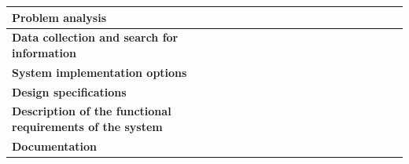 \documentclass[12pt]{article}
\begin{document}
\begin{table}[!h]
\begin{subtable}{\textwidth}
\begin{tabular}{|p{2.93cm}|p{0.15cm}|p{0.15cm}|p{0.15cm}|p{0.15cm}|p{0.15cm}|p{0.15cm}|p{0.15cm}|p{0.15cm}|p{0.15cm}|p{0.35cm}|p{0.35cm}|p{0.35cm}|p{0.35cm}|p{0.35cm}|p{0.35cm}|p{0.35cm}|}
						\hline
						\textbf{Problem analysis} & &&\cellcolor{darkgray}&\cellcolor{darkgray}&&&&&&&&&&&&\\
						\hline
						\textbf{Data collection and search for information} & &&&&\cellcolor{darkgray}&\cellcolor{darkgray}&\cellcolor{darkgray}&\cellcolor{darkgray}&\cellcolor{darkgray}&\cellcolor{darkgray}&\cellcolor{darkgray}&\cellcolor{darkgray}&\cellcolor{darkgray}&&&\\
						\hline
						\textbf{System implementation options} & &&&&&\cellcolor{darkgray}&\cellcolor{darkgray}&\cellcolor{darkgray}&\cellcolor{darkgray}&&&&&&&\\
						\hline
						\textbf{Design specifications} & &&&&&&&&\cellcolor{darkgray}&\cellcolor{darkgray}&\cellcolor{darkgray}&\cellcolor{darkgray}&\cellcolor{darkgray}&&&\\
						\hline
						\textbf{Description of the functional requirements of the system} & &&&&&&\cellcolor{darkgray}&\cellcolor{darkgray}&\cellcolor{darkgray}&\cellcolor{darkgray}&\cellcolor{darkgray}&\cellcolor{darkgray}&\cellcolor{darkgray}&\cellcolor{darkgray}&\cellcolor{darkgray}&\\
						\hline
						\textbf{Documentation} & &\cellcolor{darkgray}&\cellcolor{darkgray}&\cellcolor{darkgray}&\cellcolor{darkgray}&\cellcolor{darkgray}&\cellcolor{darkgray}&\cellcolor{darkgray}&\cellcolor{darkgray}&\cellcolor{darkgray}&\cellcolor{darkgray}&\cellcolor{darkgray}&\cellcolor{darkgray}&\cellcolor{darkgray}&\cellcolor{darkgray}&\cellcolor{darkgray}\\
						\hline
					\end{tabular}
				\end{subtable}
			\end{table}
\end{document}
